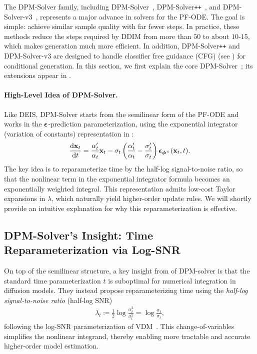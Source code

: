 The DPM-Solver family, including DPM-Solver~\citep{lu2022dpm}, DPM-Solver\texttt{++}~\citep{lu2022dpm2}, and DPM-Solver-v3~\citep{zheng2023dpm}, represents a major advance in solvers for the PF-ODE. The goal is simple: achieve similar sample quality with far fewer steps. In practice, these methods reduce the steps required by DDIM from more than $50$ to about $10$-$15$, which makes generation much more efficient. In addition, DPM-Solver\texttt{++} and DPM-Solver-v3 are designed to handle classifier free guidance (CFG) (see ) for conditional generation. In this section, we first explain the core DPM-Solver~\citep{lu2022dpm}; its extensions appear in .

\paragraph{High-Level Idea of DPM-Solver.}
Like DEIS, DPM-Solver starts from the semilinear form of the PF-ODE and works in the ${\bm{\epsilon}}$-prediction parameterization, using the exponential integrator (variation of constants) representation in :
\begin{align}\label{eq:noise-alpha-sigma}
    \frac{\mathop{}\!\mathrm{d} {\mathbf{x}}_t}{\mathop{}\!\mathrm{d} t}
= \frac{\alpha_t'}{\alpha_t}{\mathbf{x}}_t
- \sigma_t \left(\frac{\alpha_t'}{\alpha_t}-\frac{\sigma_t'}{\sigma_t}\right)
{\bm{\epsilon}}_{{\bm{\phi}}^\times}({\mathbf{x}}_t,t).
\end{align}
The key idea is to reparameterize time by the half-log signal-to-noise ratio, so that the nonlinear term in the exponential integrator formula becomes an exponentially weighted integral. This representation admits low-cost Taylor expansions in $\lambda$, which naturally yield higher-order update rules. We will shortly provide an intuitive explanation for why this reparameterization is effective.



\subsection{DPM-Solver's Insight: Time Reparameterization via Log-SNR}\label{subsec:dpm-method}   
On top of the semilinear structure, a key insight from of DPM-solver is that the standard time parameterization $t$ is suboptimal for numerical integration in diffusion models. They instead propose reparameterizing time using the \emph{half-log signal-to-noise ratio} (half-log SNR) 
\begin{align}\label{eq:lambda}
    \lambda_t \coloneqq \frac{1}{2}\log \frac{\alpha_t^2}{\sigma_t^2}  =  \log \frac{\alpha_t}{\sigma_t},
\end{align}
following the log-SNR parameterization of VDM~\citep{kingma2021variational}.
This change-of-variables simplifies the nonlinear integrand, thereby enabling more tractable and accurate higher-order model estimation.







